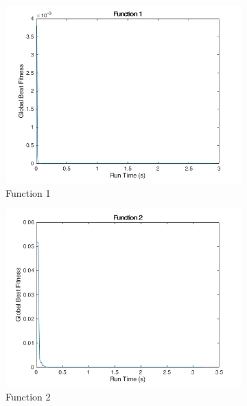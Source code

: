 \begin{figure}
  \centering
  \begin{subfigure}[b]{0.4\textwidth}
    \includegraphics[width=\textwidth]{img/summary/function1}
    \caption{Function 1}
  \end{subfigure}
  \begin{subfigure}[b]{0.4\textwidth}
    \includegraphics[width=\textwidth]{img/summary/function2}
    \caption{Function 2}
  \end{subfigure}
  \begin{subfigure}[b]{0.4\textwidth}

\end{subfigure}
\end{figure}
